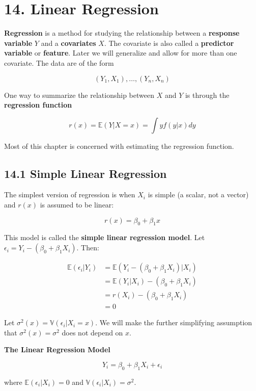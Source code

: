 \section{14. Linear Regression}\label{linear-regression}

\textbf{Regression} is a method for studying the relationship between a
\textbf{response variable} \(Y\) and a \textbf{covariates} \(X\). The
covariate is also called a \textbf{predictor variable} or
\textbf{feature}. Later we will generalize and allow for more than one
covariate. The data are of the form

\[ (Y_1, X_1), \dots, (Y_n, X_n) \]

One way to summarize the relationship between \(X\) and \(Y\) is through
the \textbf{regression function}

\[ r(x) = \mathbb{E}(Y | X = x) = \int y f(y | x) dy \]

Most of this chapter is concerned with estimating the regression
function.

\subsection{14.1 Simple Linear
Regression}\label{simple-linear-regression}

The simplest version of regression is when \(X_i\) is simple (a scalar,
not a vector) and \(r(x)\) is assumed to be linear:

\[r(x) = \beta_0 + \beta_1 x\]

This model is called the \textbf{simple linear regression model}. Let
\(\epsilon_i = Y_i - (\beta_0 + \beta_1 X_i)\). Then:

\begin{align}
\mathbb{E}(\epsilon_i | Y_i) &= \mathbb{E}(Y_i - (\beta_0 + \beta_1 X_i) | X_i)\\
&= \mathbb{E}(Y_i | X_i) - (\beta_0 + \beta_1 X_i)\\
&= r(X_i) - (\beta_0 + \beta_1 X_i)\\
&= 0
\end{align}

Let \(\sigma^2(x) = \mathbb{V}(\epsilon_i | X_i = x)\). We will make the
further simplifying assumption that \(\sigma^2(x) = \sigma^2\) does not
depend on \(x\).

\textbf{The Linear Regression Model}

\[Y_i = \beta_0 + \beta_1 X_i + \epsilon_i\]

where \(\mathbb{E}(\epsilon_i | X_i) = 0\) and
\(\mathbb{V}(\epsilon_i | X_i) = \sigma^2\).

